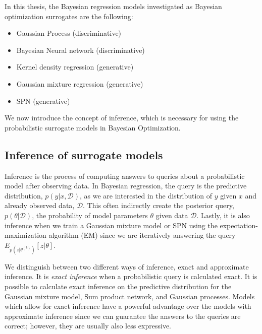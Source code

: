 In this thesis, the Bayesian regression models investigated as Bayesian optimization surrogates are
the following:
\begin{itemize}[noitemsep]
    \item Gaussian Process (discriminative)
    \item Bayesian Neural network (discriminative)
    \item Kernel density regression (generative)
    \item Gaussian mixture regression (generative)
    \item SPN (generative)
\end{itemize}

We now introduce the concept of inference, which is necessary for using the probabilistic surrogate models
in Bayesian Optimization. 

\subsection{Inference of surrogate models}
Inference is the process of computing answers to queries about a probabilistic model after observing
data. In Bayesian regression, the query is the predictive distribution, $p(y|x,\mathcal{D})$, as we
are interested in the distribution of $y$ given $x$ and already observed data, $\mathcal{D}$. This
often indirectly create the posterior query, $p(\theta|\mathcal{D})$, the probability of model
parameters $\theta$ given data $\mathcal{D}$. Lastly, it is also inference when we train a Gaussian
mixture model or SPN using the expectation-maximization algorithm (EM) since we are iteratively
answering the query $E_{p(z|\theta^{(k)})}[z|\theta]$.

We distinguish between two different ways of inference, exact and approximate inference. It is
\textit{exact inference} when a probabilistic query is calculated exact. It is possible to
calculate exact inference on the predictive distribution for the Gaussian mixture model, Sum product
network, and Gaussian processes. Models which allow for exact inference have a powerful advantage
over the models with approximate inference since we can guarantee the answers to the queries are
correct; however, they are usually also less expressive.


